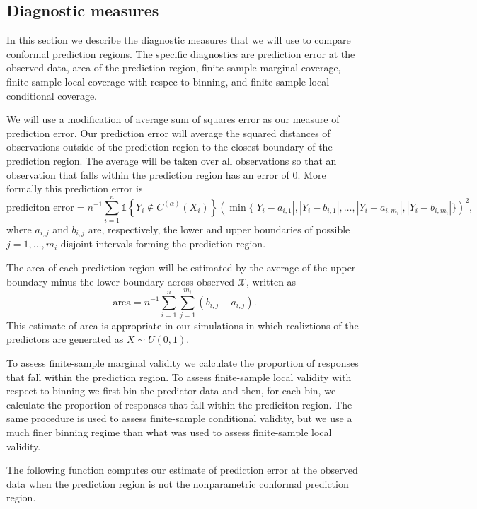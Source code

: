 \documentclass[11pt]{article}\usepackage[]{graphicx}\usepackage[]{color}
\newcommand{\Copt}{C^{(\alpha)}}
\newcommand{\X}{\mathcal{X}}
\newcommand{\indicator}[1]{\mathds{1}\left\{ #1 \right\}}
\begin{document}
\subsection{Diagnostic measures}

In this section we describe the diagnostic measures that we will use to 
compare conformal prediction regions.
The specific diagnostics are 
prediction error at the observed data, 
area of the prediction region, 
finite-sample marginal coverage,
finite-sample local coverage with respec to binning, 
and 
finite-sample local conditional coverage.  

We will use a modification of average sum of squares error as our measure of 
prediction error.  Our prediction error will average the squared distances of 
observations outside of the prediction region to the closest boundary of the 
prediction region.  The average will be taken over all observations so that an 
observation that falls within the prediction region has an error of 0.  
More formally this prediction error is 
$$
  \text{prediciton error} 
    = n^{-1}\sum_{i=1}^n\indicator{Y_i \not\in \Copt(X_i)}
      \left(\min\{|Y_i - a_{i,1}|, |Y_i - b_{i,1}|, \ldots, 
      |Y_i - a_{i,m_i}|, |Y_i - b_{i,m_i}|\}\right)^2,
$$
where $a_{i,j}$ and $b_{i,j}$ are, respectively, the lower and upper 
boundaries of possible $j = 1, \ldots, m_i$ disjoint intervals forming 
the prediction region.  

The area of each prediction region will be estimated by the average of the 
upper boundary minus the lower boundary across observed $\X$, written as
$$ 
  \text{area} = n^{-1}\sum_{i=1}^n\sum_{j=1}^{m_i}(b_{i,j} - a_{i,j}).
$$
This estimate of area is appropriate in our simulations in which realiztions 
of the predictors are generated as $X \sim U(0,1)$.   

To assess finite-sample marginal validity we calculate the proportion of 
responses that fall within the prediction region.  To assess finite-sample 
local validity with respect to binning we first bin the predictor data and 
then, for each bin, we calculate the proportion of responses that fall 
within the prediciton region. The same procedure is used to assess 
finite-sample conditional validity, but we use a much finer binning regime 
than what was used to assess finite-sample local validity.  

The following function computes our estimate of prediction error at the 
observed data when the prediction region is not the nonparametric 
conformal prediction region.
\end{document}

